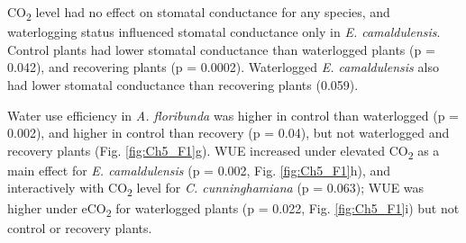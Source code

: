 \documentclass[12pt,a4paper]{memoir}
\begin{document}
CO\textsubscript{2} level had no effect on stomatal conductance for any species, and waterlogging status influenced stomatal conductance only in \textit{E. camaldulensis}. Control plants had lower stomatal conductance than waterlogged plants (p = 0.042), and recovering plants (p = 0.0002). Waterlogged \textit{E. camaldulensis} also had lower stomatal conductance than recovering plants (0.059).

Water use efficiency in \textit{A. floribunda} was higher in control than waterlogged (p = 0.002), and higher in control than recovery (p = 0.04), but not waterlogged and recovery plants (Fig. \ref{fig:Ch5_F1}g). WUE increased under elevated CO\textsubscript{2} as a main effect for \textit{E. camaldulensis} (p = 0.002, Fig. \ref{fig:Ch5_F1}h), and interactively with CO\textsubscript{2} level for \textit{C. cunninghamiana} (p = 0.063); WUE was higher under eCO\textsubscript{2} for waterlogged plants (p = 0.022, Fig. \ref{fig:Ch5_F1}i) but not control or recovery plants.
\end{document}
